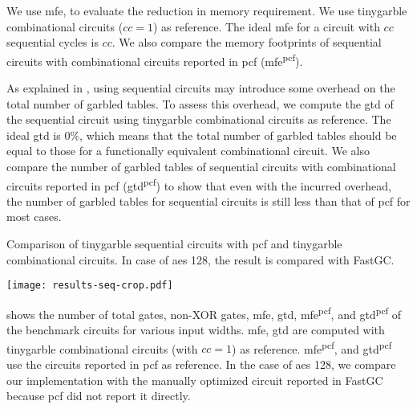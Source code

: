 We use \acrfull{mfe}, to evaluate the reduction in memory requirement.
We use \gls{tinygarble} combinational circuits ($cc=1$) as reference.
The ideal \acrshort{mfe} for a circuit with $cc$ sequential cycles is $cc$.
We also compare the memory footprints of sequential circuits with combinational circuits reported in \gls{pcf} (\acrshort{mfe}\textsuperscript{\gls{pcf}}).

As explained in , using sequential circuits may introduce some overhead on the total number of garbled tables.
To assess this overhead, we compute the \acrshort{gtd} of the sequential circuit using \gls{tinygarble} combinational circuits as reference.
The ideal \acrshort{gtd} is $0\%$, which means that the total number of garbled tables should be equal to those for a functionally equivalent combinational circuit.
We also compare the number of garbled tables of sequential circuits with combinational circuits reported in \gls{pcf} (\acrshort{gtd}\textsuperscript{\gls{pcf}}) to show that even with the incurred overhead, the number of garbled tables for sequential circuits is still less than that of \gls{pcf} for most cases.

\begin{table}[t]
\centering
\caption{Comparison of \gls{tinygarble} sequential circuits with \gls{pcf} and \gls{tinygarble} combinational circuits.
In case of \acrshort{aes} 128, the result is compared with FastGC.}
\label{table:result-seq}
\texttt{[image: results-seq-crop.pdf]}
\end{table}

 shows the number of total gates, non-XOR gates, \acrshort{mfe}, \acrshort{gtd}, \acrshort{mfe}\textsuperscript{\gls{pcf}}, and \acrshort{gtd}\textsuperscript{\gls{pcf}} of the benchmark circuits for various input widths.
\acrshort{mfe}, \acrshort{gtd} are computed with \gls{tinygarble} combinational circuits (with $cc=1$) as reference.
\acrshort{mfe}\textsuperscript{\gls{pcf}}, and \acrshort{gtd}\textsuperscript{\gls{pcf}} use the circuits reported in \gls{pcf} as reference.
In the case of \acrshort{aes} 128, we compare our implementation with the manually optimized circuit reported in FastGC \cite{huang2011faster} because \gls{pcf} did not report it directly.

